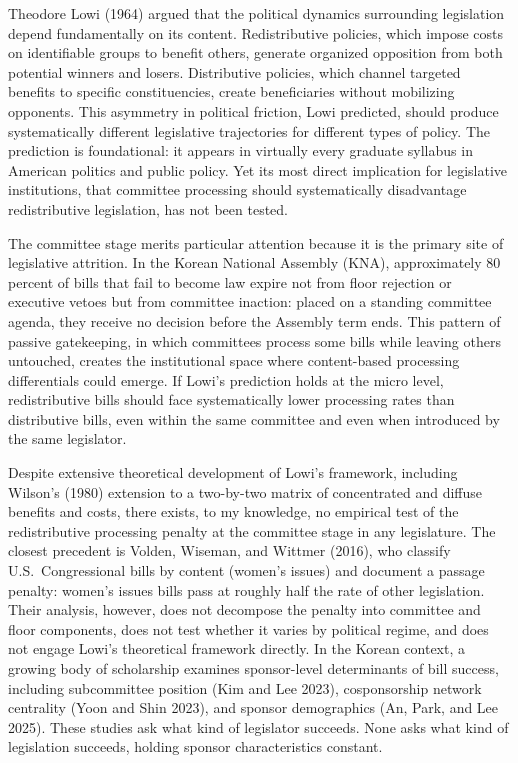 \documentclass[11pt]{article}
\begin{document}
Theodore Lowi (1964) argued that the political dynamics surrounding legislation depend fundamentally on its content. Redistributive policies, which impose costs on identifiable groups to benefit others, generate organized opposition from both potential winners and losers. Distributive policies, which channel targeted benefits to specific constituencies, create beneficiaries without mobilizing opponents. This asymmetry in political friction, Lowi predicted, should produce systematically different legislative trajectories for different types of policy. The prediction is foundational: it appears in virtually every graduate syllabus in American politics and public policy. Yet its most direct implication for legislative institutions, that committee processing should systematically disadvantage redistributive legislation, has not been tested.

The committee stage merits particular attention because it is the primary site of legislative attrition. In the Korean National Assembly (KNA), approximately 80 percent of bills that fail to become law expire not from floor rejection or executive vetoes but from committee inaction: placed on a standing committee agenda, they receive no decision before the Assembly term ends. This pattern of passive gatekeeping, in which committees process some bills while leaving others untouched, creates the institutional space where content-based processing differentials could emerge. If Lowi's prediction holds at the micro level, redistributive bills should face systematically lower processing rates than distributive bills, even within the same committee and even when introduced by the same legislator.

Despite extensive theoretical development of Lowi's framework, including Wilson's (1980) extension to a two-by-two matrix of concentrated and diffuse benefits and costs, there exists, to my knowledge, no empirical test of the redistributive processing penalty at the committee stage in any legislature. The closest precedent is Volden, Wiseman, and Wittmer (2016), who classify U.S.\ Congressional bills by content (women's issues) and document a passage penalty: women's issues bills pass at roughly half the rate of other legislation. Their analysis, however, does not decompose the penalty into committee and floor components, does not test whether it varies by political regime, and does not engage Lowi's theoretical framework directly. In the Korean context, a growing body of scholarship examines sponsor-level determinants of bill success, including subcommittee position (Kim and Lee 2023), cosponsorship network centrality (Yoon and Shin 2023), and sponsor demographics (An, Park, and Lee 2025). These studies ask what kind of legislator succeeds. None asks what kind of legislation succeeds, holding sponsor characteristics constant.
\end{document}
